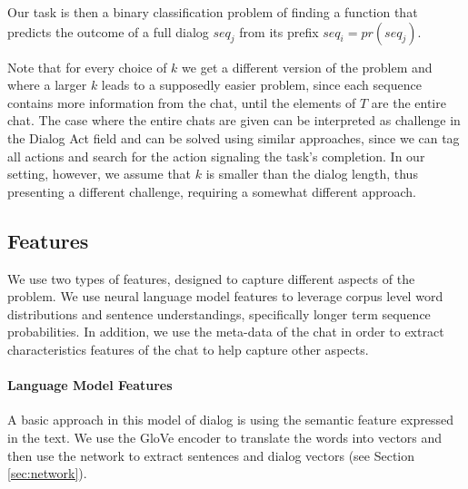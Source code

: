 
Our task is then a binary classification 
problem of finding a function that predicts the outcome 
of a full dialog $seq_j$ from its prefix $seq_i = pr(seq_j)$. 

Note that for every choice of $k$ we get a different 
version of the problem and where a larger $k$ leads 
to a supposedly easier problem, since each sequence contains 
more information from the chat, until the elements of $T$ 
are the entire chat. The case where the entire chats are 
given can be interpreted as challenge in the Dialog Act \cite{cs-CL-0006023,DBLP:conf/icassp/JiB05,DBLP:conf/coling/WermterL96}
field and can be solved using similar approaches, since we 
can tag all actions and search for the action signaling the task's completion. 
In our setting, however, we assume that $k$ is smaller than the dialog 
length, thus presenting a different challenge, requiring a somewhat different approach. 

\subsection{Features}
We use two types of features, designed to capture
different aspects of the problem. We use neural 
language model features to leverage corpus
level word distributions and sentence understandings, 
specifically longer term
sequence probabilities. In addition, we use the meta-data of the chat in order to extract characteristics features of the chat 
to help capture other aspects.

\paragraph*{Language Model Features}
A basic approach in this model of dialog is 
using the semantic feature expressed in the text. 
We use the GloVe \cite{glove} encoder to translate the words 
into vectors and then use the network to extract sentences and 
dialog vectors (see Section \ref{sec:network}). 



